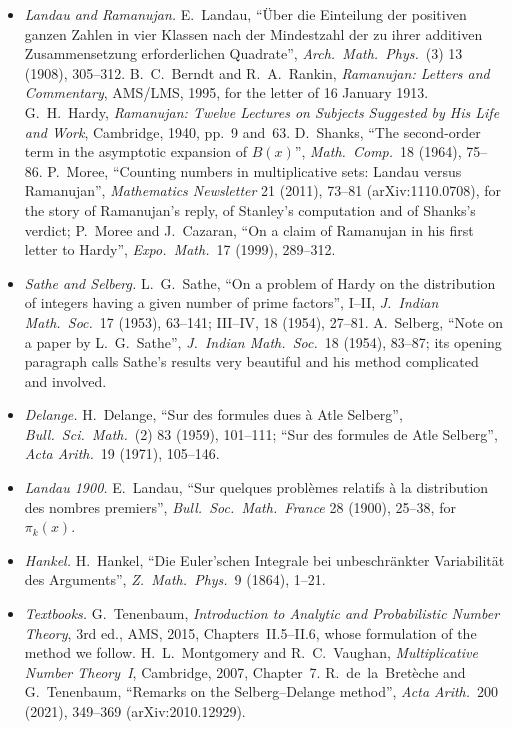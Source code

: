 \begin{itemize}
\item \emph{Landau and Ramanujan.} E.~Landau, ``Über die Einteilung der positiven ganzen Zahlen in vier Klassen nach der Mindestzahl der zu ihrer additiven Zusammensetzung erforderlichen Quadrate'', \emph{Arch.\ Math.\ Phys.}\ (3) 13 (1908), 305--312. B.~C.~Berndt and R.~A.~Rankin, \emph{Ramanujan: Letters and Commentary}, AMS/LMS, 1995, for the letter of 16 January 1913. G.~H.~Hardy, \emph{Ramanujan: Twelve Lectures on Subjects Suggested by His Life and Work}, Cambridge, 1940, pp.~9 and~63. D.~Shanks, ``The second-order term in the asymptotic expansion of $B(x)$'', \emph{Math.\ Comp.}\ 18 (1964), 75--86. P.~Moree, ``Counting numbers in multiplicative sets: Landau versus Ramanujan'', \emph{Mathematics Newsletter} 21 (2011), 73--81 (arXiv:1110.0708), for the story of Ramanujan's reply, of Stanley's computation and of Shanks's verdict; P.~Moree and J.~Cazaran, ``On a claim of Ramanujan in his first letter to Hardy'', \emph{Expo.\ Math.}\ 17 (1999), 289--312.
\item \emph{Sathe and Selberg.} L.~G.~Sathe, ``On a problem of Hardy on the distribution of integers having a given number of prime factors'', I--II, \emph{J.\ Indian Math.\ Soc.}\ 17 (1953), 63--141; III--IV, 18 (1954), 27--81. A.~Selberg, ``Note on a paper by L.~G.~Sathe'', \emph{J.\ Indian Math.\ Soc.}\ 18 (1954), 83--87; its opening paragraph calls Sathe's results very beautiful and his method complicated and involved.
\item \emph{Delange.} H.~Delange, ``Sur des formules dues à Atle Selberg'', \emph{Bull.\ Sci.\ Math.}\ (2) 83 (1959), 101--111; ``Sur des formules de Atle Selberg'', \emph{Acta Arith.}\ 19 (1971), 105--146.
\item \emph{Landau 1900.} E.~Landau, ``Sur quelques problèmes relatifs à la distribution des nombres premiers'', \emph{Bull.\ Soc.\ Math.\ France} 28 (1900), 25--38, for $\pi_k(x)$.
\item \emph{Hankel.} H.~Hankel, ``Die Euler'schen Integrale bei unbeschränkter Variabilität des Arguments'', \emph{Z.\ Math.\ Phys.}\ 9 (1864), 1--21.
\item \emph{Textbooks.} G.~Tenenbaum, \emph{Introduction to Analytic and Probabilistic Number Theory}, 3rd ed., AMS, 2015, Chapters~II.5--II.6, whose formulation of the method we follow. H.~L.~Montgomery and R.~C.~Vaughan, \emph{Multiplicative Number Theory~I}, Cambridge, 2007, Chapter~7. R.~de~la~Bretèche and G.~Tenenbaum, ``Remarks on the Selberg--Delange method'', \emph{Acta Arith.}\ 200 (2021), 349--369 (arXiv:2010.12929).
\end{itemize}
